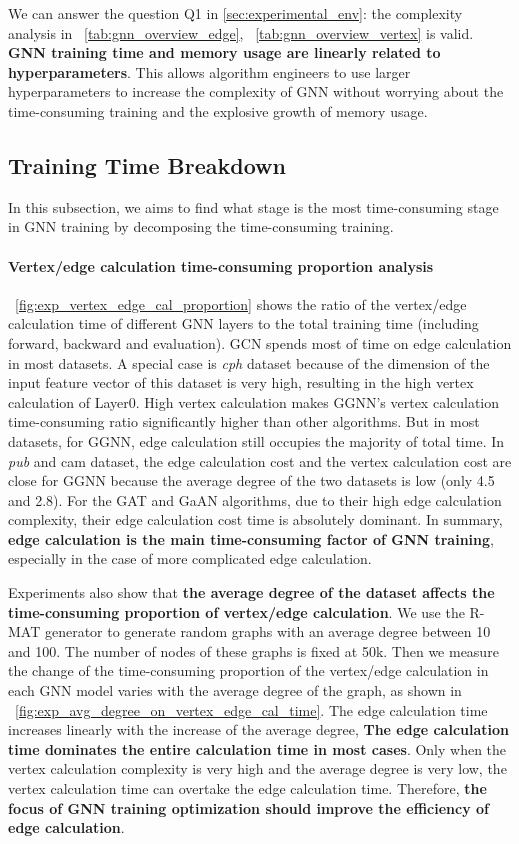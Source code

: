We can answer the question Q1 in \ref{sec:experimental_env}: the complexity analysis in \tablename~\ref{tab:gnn_overview_edge}, \tablename~\ref{tab:gnn_overview_vertex} is valid.
\textbf{GNN training time and memory usage are linearly related to hyperparameters}.
This allows algorithm engineers to use larger hyperparameters to increase the complexity of GNN without worrying about the time-consuming training and the explosive growth of memory usage.

\subsection{Training Time Breakdown}
\label{sec:training_time_breakdown}

In this subsection, we aims to find what stage is the most time-consuming stage in GNN training by decomposing the time-consuming training.

\paragraph{Vertex/edge calculation time-consuming proportion analysis}

\figurename~\ref{fig:exp_vertex_edge_cal_proportion} shows the ratio of the vertex/edge calculation time of different GNN layers
to the total training time (including forward, backward and evaluation). GCN spends most of time on edge calculation in most datasets. A special case is  \textit{cph} dataset because of
the dimension of the input feature vector of this dataset is very high, resulting in the high vertex calculation of Layer0.
High vertex calculation makes GGNN's vertex calculation time-consuming ratio significantly higher than other algorithms.
But in most datasets, for GGNN, edge calculation still occupies the majority of total time.
In \textit{pub} and cam dataset, the edge calculation cost and the vertex calculation cost are close for GGNN
because the average degree of the two datasets is low (only 4.5 and 2.8).
For the GAT and GaAN algorithms, due to their high edge calculation complexity, their edge calculation cost time is absolutely dominant.
In summary, \textbf{edge calculation is the main time-consuming factor of GNN training}, especially in the case of more complicated edge calculation.

Experiments also show that \textbf{the average degree of the dataset affects the time-consuming proportion of vertex/edge calculation}.
We use the R-MAT generator to generate random graphs with an average degree between 10 and 100. The number of nodes of these graphs is fixed at 50k.
Then we measure the change of the time-consuming proportion of the vertex/edge calculation in each GNN model varies with the average degree of the graph,
as shown in \figurename~\ref{fig:exp_avg_degree_on_vertex_edge_cal_time}. The edge calculation time increases linearly with the increase of the average degree,
\textbf{The edge calculation time dominates the entire calculation time in most cases}.
Only when the vertex calculation complexity is very high and the average degree is very low, the vertex calculation time can overtake the edge calculation time.
Therefore, \textbf{the focus of GNN training optimization should improve the efficiency of edge calculation}.

